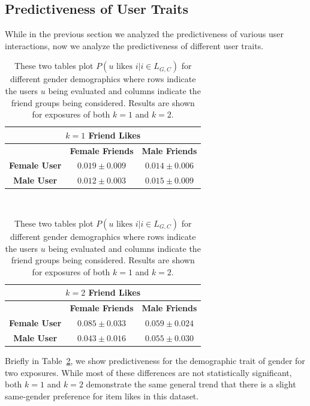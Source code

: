 \subsection{Predictiveness of User Traits}

\label{sec:interest_history}

While in the previous section we analyzed the predictiveness
of various user interactions, now we analyze the predictiveness
of different user traits.

\begin{table}[t!]
\centering
\begin{tabular}{|c|c|c|} 
\multicolumn{3}{c}{\textbf{$k = 1$ Friend Likes}} \\ \hline
& \textbf{Female Friends} & \textbf{Male Friends} \\ \hline
\textbf{Female User} & $0.019 \pm 0.009$ & $0.014 \pm 0.006$ \\ \hline
\textbf{Male User}   & $0.012 \pm 0.003$ & $0.015 \pm 0.009$ \\ \hline
\end{tabular} $\qquad$
\begin{tabular}{|c|c|c|} 
\multicolumn{3}{c}{\textbf{$k = 2$ Friend Likes}} \\ \hline
& \textbf{Female Friends} & \textbf{Male Friends} \\ \hline
\textbf{Female User} & $0.085 \pm 0.033$ & $0.059 \pm 0.024$ \\ \hline
\textbf{Male User}   & $0.043 \pm 0.016$ & $0.055 \pm 0.030$ \\ \hline
\end{tabular}
\caption{These two tables plot $P(u \mbox{ likes } i | i \in L_{G,C})$
for different gender demographics where rows indicate the
users $u$ being evaluated and columns indicate the friend groups
being considered.  Results are shown for exposures of both
$k=1$ and $k=2$.}
\label{fig:res6}
\end{table}

Briefly in Table~\ref{fig:res6}, we show predictiveness for
the demographic trait of gender for two exposures.  
While most of these differences are
not statistically significant, both $k=1$ and $k=2$ demonstrate
the same general trend that there is a slight same-gender
preference for item likes in this dataset.


